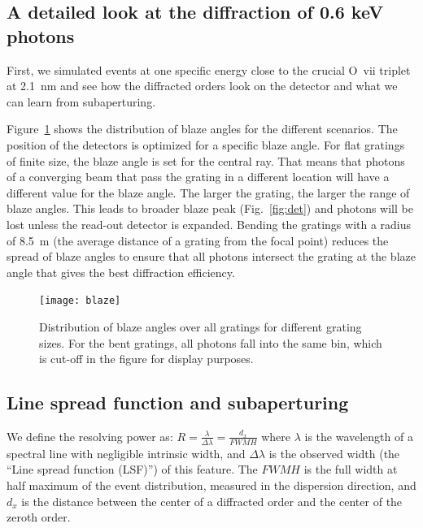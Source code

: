 \documentclass[12pt]{spieman}  %
\begin{document}
\begin{spacing}{1}
\subsection{A detailed look at the diffraction of 0.6 keV photons}
First, we simulated events at one specific energy close to the crucial O~{\sc vii} triplet at 2.1~nm and see how the diffracted orders look on the detector and what we can learn from subaperturing.

Figure~\ref{fig:blaze} shows the distribution of blaze angles for the different scenarios. The position of the detectors is optimized for a specific blaze angle. For flat gratings of finite size, the blaze angle is set for the central ray. That means that photons of a converging beam that pass the grating in a different location will have a different value for the blaze angle. The larger the grating, the larger the range of blaze angles. This leads to broader blaze peak (Fig.~\ref{fig:det}) and photons will be lost unless the read-out detector is expanded. Bending the gratings with a radius of 8.5~m (the average distance of a grating from the focal point) reduces the spread of blaze angles to ensure that all photons intersect the grating at the blaze angle that gives the best diffraction efficiency.
\label{sect:blaze}

\begin{figure} [ht]
  \begin{center}
  \texttt{[image: blaze]}
  \end{center}
  \caption {\label{fig:blaze}
    Distribution of blaze angles over all gratings for different grating sizes. For the bent gratings, all photons fall into the same bin, which is cut-off in the figure for display purposes.
  }
\end{figure}

\subsection{Line spread function and subaperturing}
\label{sect:LSF}
We define the resolving power as: $R = \frac{\lambda}{\Delta \lambda} =
\frac{d_x}{FWMH}$ where $\lambda$ is the wavelength of a spectral line with negligible intrinsic width, and $\Delta \lambda$ is the observed width (the ``Line spread function (LSF)'') of this feature. The $FWMH$ is the full width at half maximum of the event distribution, measured in the dispersion direction, and $d_x$ is the distance between the center of a diffracted order and the center of the zeroth order.


\end{spacing}
\end{document}
